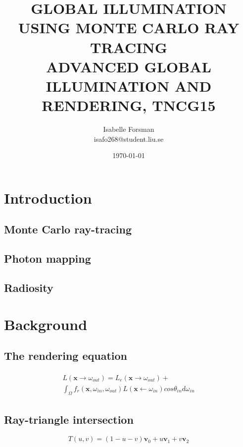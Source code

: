 \documentclass[twocolumn]{article}
\title{GLOBAL ILLUMINATION USING MONTE CARLO RAY TRACING \\ {\small\vspace{-1.0em} ADVANCED GLOBAL ILLUMINATION AND RENDERING, TNCG15}}
\author{Isabelle Forsman\\isafo268@student.liu.se}
\date{\today}
\begin{document}
\maketitle

\begin{abstract}

\end{abstract}


\section{Introduction}

\subsection{Monte Carlo ray-tracing}

\subsection{Photon mapping}

\subsection{Radiosity}

\section{Background}

\subsection{The rendering equation}

\begin{align}
\label{eq:rendereq}
\begin{split}
	 L(\mathbf{x} \rightarrow \omega_{out}) = L_e(\mathbf{x} \rightarrow \omega_{out}) + \\ \int_{\Omega} f_r(\mathbf{x}, \omega_{in}, \omega_{out})L(\mathbf{x} \leftarrow \omega_{in})cos\theta_{in}d\omega_{in}
\end{split}
\end{align}

\subsection{Ray-triangle intersection}

\begin{equation}
	T(u,v) = (1 - u - v)\mathbf{v}_0 + u\mathbf{v}_1 + v\mathbf{v}_2
\end{equation}
\end{document}
